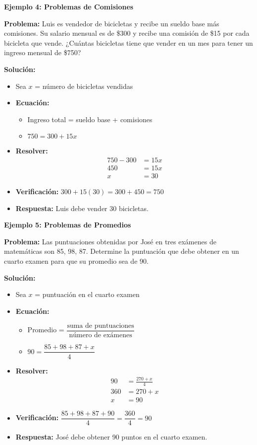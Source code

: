 \begin{example}
\textbf{Ejemplo 4: Problemas de Comisiones}

\textbf{Problema:} Luis es vendedor de bicicletas y recibe un sueldo base más comisiones. Su salario mensual es de \$300 y recibe una comisión de \$15 por cada bicicleta que vende. ¿Cuántas bicicletas tiene que vender en un mes para tener un ingreso mensual de \$750?

\textbf{Solución:}
\begin{itemize}
    \item Sea $x$ = número de bicicletas vendidas
    \item \textbf{Ecuación:}
    \begin{itemize}
        \item Ingreso total = sueldo base + comisiones
        \item $750 = 300 + 15x$
    \end{itemize}
    \item \textbf{Resolver:}
    \begin{align*}
    750 - 300 &= 15x \\
    450 &= 15x \\
    x &= 30
    \end{align*}
    \item \textbf{Verificación:} $300 + 15(30) = 300 + 450 = 750$ \checkmark
    \item \textbf{Respuesta:} Luis debe vender 30 bicicletas.
\end{itemize}
\end{example}

\begin{example}
\textbf{Ejemplo 5: Problemas de Promedios}

\textbf{Problema:} Las puntuaciones obtenidas por José en tres exámenes de matemáticas son 85, 98, 87. Determine la puntuación que debe obtener en un cuarto examen para que su promedio sea de 90.

\textbf{Solución:}
\begin{itemize}
    \item Sea $x$ = puntuación en el cuarto examen
    \item \textbf{Ecuación:}
    \begin{itemize}
        \item Promedio = $\dfrac{\text{suma de puntuaciones}}{\text{número de exámenes}}$
        \item $90 = \dfrac{85 + 98 + 87 + x}{4}$
    \end{itemize}
    \item \textbf{Resolver:}
    \begin{align*}
    90 &= \frac{270 + x}{4} \\
    360 &= 270 + x \\
    x &= 90
    \end{align*}
    \item \textbf{Verificación:} $\dfrac{85 + 98 + 87 + 90}{4} = \dfrac{360}{4} = 90$ \checkmark
    \item \textbf{Respuesta:} José debe obtener 90 puntos en el cuarto examen.
\end{itemize}
\end{example}

